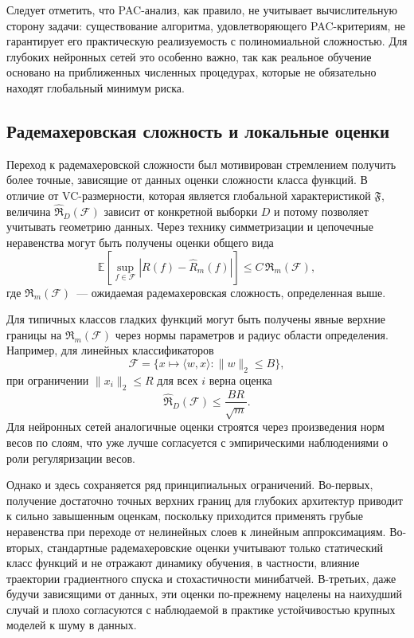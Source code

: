 Следует отметить, что PAC-анализ, как правило, не учитывает вычислительную сторону задачи: существование алгоритма, удовлетворяющего PAC-критериям, не гарантирует его практическую реализуемость с полиномиальной сложностью. Для глубоких нейронных сетей это особенно важно, так как реальное обучение основано на приближенных численных процедурах, которые не обязательно находят глобальный минимум риска.

\subsection{Радемахеровская сложность и локальные оценки}

Переход к радемахеровской сложности был мотивирован стремлением получить более точные, зависящие от данных оценки сложности класса функций. В отличие от VC-размерности, которая является глобальной характеристикой $\mathfrak{F}$, величина $\hat{\mathfrak{R}}_D(\mathcal{F})$ зависит от конкретной выборки $D$ и потому позволяет учитывать геометрию данных. Через технику симметризации и цепочечные неравенства могут быть получены оценки общего вида
\[
    \mathbb{E}\left[\sup_{f \in \mathcal{F}} |R(f) - \hat{R}_m(f)|\right] \leq C \, \mathfrak{R}_m(\mathcal{F}),
\]
где $\mathfrak{R}_m(\mathcal{F})$~--- ожидаемая радемахеровская сложность, определенная выше.

Для типичных классов гладких функций могут быть получены явные верхние границы на $\mathfrak{R}_m(\mathcal{F})$ через нормы параметров и радиус области определения. Например, для линейных классификаторов
\[
    \mathcal{F} = \{x \mapsto \langle w, x \rangle : \|w\|_2 \leq B\},
\]
при ограничении $\|x_i\|_2 \leq R$ для всех $i$ верна оценка
\[
    \hat{\mathfrak{R}}_D(\mathcal{F}) \leq \frac{BR}{\sqrt{m}}.
\]
Для нейронных сетей аналогичные оценки строятся через произведения норм весов по слоям, что уже лучше согласуется с эмпирическими наблюдениями о роли регуляризации весов.

Однако и здесь сохраняется ряд принципиальных ограничений. Во-первых, получение достаточно точных верхних границ для глубоких архитектур приводит к сильно завышенным оценкам, поскольку приходится применять грубые неравенства при переходе от нелинейных слоев к линейным аппроксимациям. Во-вторых, стандартные радемахеровские оценки учитывают только статический класс функций и не отражают динамику обучения, в частности, влияние траектории градиентного спуска и стохастичности минибатчей. В-третьих, даже будучи зависящими от данных, эти оценки по-прежнему нацелены на наихудший случай и плохо согласуются с наблюдаемой в практике устойчивостью крупных моделей к шуму в данных.

